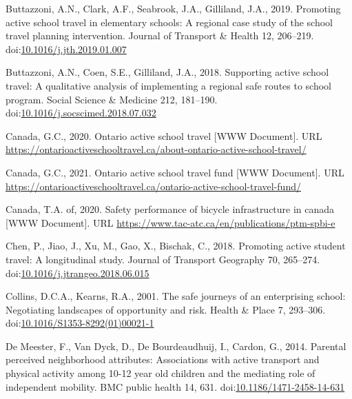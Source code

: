 \documentclass[]{elsarticle} %
\newlength{\cslhangindent}
\newlength{\cslentryspacingunit} %
\newenvironment{CSLReferences}[2] %
 {%
  \setlength{\parindent}{0pt}
  \ifodd #1
  \let\oldpar\par
  \def\par{\hangindent=\cslhangindent\oldpar}
  \fi
  \setlength{\parskip}{#2\cslentryspacingunit}
 }%
 {}
\begin{document}
\begin{CSLReferences}{1}{0}
\leavevmode{}%
Buttazzoni, A.N., Clark, A.F., Seabrook, J.A., Gilliland, J.A., 2019.
Promoting active school travel in elementary schools: A regional case
study of the school travel planning intervention. Journal of Transport
\& Health 12, 206--219.
doi:\href{https://doi.org/10.1016/j.jth.2019.01.007}{10.1016/j.jth.2019.01.007}

\leavevmode{}%
Buttazzoni, A.N., Coen, S.E., Gilliland, J.A., 2018. Supporting active
school travel: A qualitative analysis of implementing a regional safe
routes to school program. Social Science \& Medicine 212, 181--190.
doi:\href{https://doi.org/10.1016/j.socscimed.2018.07.032}{10.1016/j.socscimed.2018.07.032}

\leavevmode{}%
Canada, G.C., 2020. Ontario active school travel {[}WWW Document{]}. URL
\url{https://ontarioactiveschooltravel.ca/about-ontario-active-school-travel/}

\leavevmode{}%
Canada, G.C., 2021. Ontario active school travel fund {[}WWW
Document{]}. URL
\url{https://ontarioactiveschooltravel.ca/ontario-active-school-travel-fund/}

\leavevmode{}%
Canada, T.A. of, 2020. Safety performance of bicycle infrastructure in
canada {[}WWW Document{]}. URL
\url{https://www.tac-atc.ca/en/publications/ptm-spbi-e}

\leavevmode{}%
Chen, P., Jiao, J., Xu, M., Gao, X., Bischak, C., 2018. Promoting active
student travel: A longitudinal study. Journal of Transport Geography 70,
265--274.
doi:\href{https://doi.org/10.1016/j.jtrangeo.2018.06.015}{10.1016/j.jtrangeo.2018.06.015}

\leavevmode{}%
Collins, D.C.A., Kearns, R.A., 2001. The safe journeys of an
enterprising school: Negotiating landscapes of opportunity and risk.
Health \& Place 7, 293--306.
doi:\href{https://doi.org/10.1016/S1353-8292(01)00021-1}{10.1016/S1353-8292(01)00021-1}

\leavevmode{}%
De Meester, F., Van Dyck, D., De Bourdeaudhuij, I., Cardon, G., 2014.
Parental perceived neighborhood attributes: Associations with active
transport and physical activity among 10-12 year old children and the
mediating role of independent mobility. BMC public health 14, 631.
doi:\href{https://doi.org/10.1186/1471-2458-14-631}{10.1186/1471-2458-14-631}


\end{CSLReferences}
\end{document}
